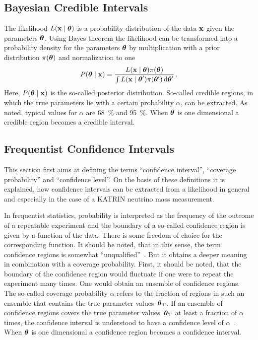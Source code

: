 \subsection{Bayesian Credible Intervals}
The likelihood $L\giventhat{\dataVec}{\paramVec}$ is a probability distribution of the data $\boldsymbol{\mathbf{x}}$ given the parameters $\boldsymbol{\mathbf{\theta}}$. Using Bayes theorem the likelihood can be transformed into a probability density for the parameters $\boldsymbol{\mathbf{\theta}}$ by multiplication with a prior distribution $\pi(\boldsymbol{\mathbf{\theta}})$ and normalization to one~\cite{ReviewOfParticlePhysics}
\begin{equation}
\label{eq:statMethodsPosterior}
	P\giventhat{\paramVec}{\dataVec} = 
		\frac{
			L\giventhat{\dataVec}{\paramVec}\pi(\paramVec)
		}{
			\int L\giventhat{\dataVec}{\paramVec^\prime}\pi(\paramVec^\prime) \d\paramVec^\prime
		}
	\fullstop
\end{equation}
Here, $P\giventhat{\paramVec}{\dataVec}$ is the so-called posterior distribution. So-called credible regions, in which the true parameters lie with a certain probability $\alpha$, can be extracted. As noted, typical values for $\alpha$ are \SI{68}{\percent} and \SI{95}{\percent}. When $\boldsymbol{\mathbf{\theta}}$ is one dimensional a credible region becomes a credible interval. 

\subsection{Frequentist Confidence Intervals}
\label{sec:statMethodsUncertaintyIntervalsConfidence}
This section first aims at defining the terms ``confidence interval'', ``coverage probability'' and ``confidence level''. On the basis of these definitions it is explained, how confidence intervals can be extracted from a likelihood in general and especially in the case of a KATRIN neutrino mass measurement.

In frequentist statistics, probability is interpreted as the frequency of the outcome of a repeatable experiment and the boundary of a so-called confidence region is given by a function of the data. There is some freedom of choice for the corresponding function. It should be noted, that in this sense, the term confidence regions is somewhat ``unqualified''~\cite{ReviewOfParticlePhysics}. But it obtains a deeper meaning in combination with a coverage probability. First, it should be noted, that the boundary of the confidence region would fluctuate if one were to repeat the experiment many times. One would obtain an ensemble of confidence regions. The so-called coverage probability $\alpha$ refers to the fraction of regions in such an ensemble that contains the true parameter values~$\boldsymbol{\mathbf{\theta}}_\mathrm{T}$\cite{ReviewOfParticlePhysics}. If an ensemble of confidence regions covers the true parameter values~$\boldsymbol{\mathbf{\theta}}_\mathrm{T}$ at least a fraction of $\alpha$ times, the confidence interval is understood to have a confidence level of $\alpha$~\cite{ReviewOfParticlePhysics}. When $\boldsymbol{\mathbf{\theta}}$ is one dimensional a confidence region becomes a confidence interval. 

